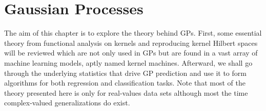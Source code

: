 \section*{Gaussian Processes}\label{Chapter1}
The aim of this chapter is to explore the theory behind GPs. First, some essential theory from functional analysis on kernels and reproducing kernel Hilbert spaces will be reviewed which are not only used in GPs but are found in a vast array of machine learning models, aptly named kernel machines. Afterward, we shall go through the underlying statistics that drive GP prediction and use it to form algorithms for both regression and classification tasks. Note that most of the theory presented here is only for real-values data sets although most the time complex-valued generalizations do exist.











